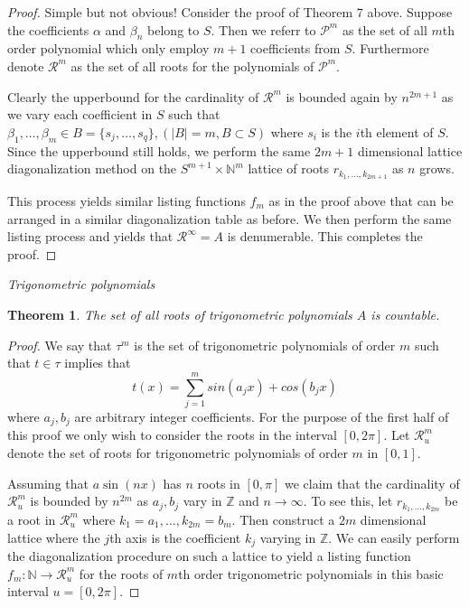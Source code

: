 \documentclass[letter]{article}
\newtheorem{theorem}{Theorem}
\newenvironment{menumerate}{%
  \edef\backupindent{\the\parindent}%
  \enumerate%
  \setlength{\parindent}{\backupindent}%
}{\endenumerate}
\begin{document}
\begin{menumerate}
\begin{menumerate}
	 		 		\begin{proof}
	 		 			Simple but not obvious! Consider the proof of Theorem 7 above. Suppose the coefficients $\alpha$ and $\beta_n$ belong to $S$. Then we referr to $\mathcal{P}^m$ as the set of all $m$th order polynomial which only employ $m+1$ coefficients from $S$. Furthermore denote $\mathcal{R}^m$ as the set of all roots for the polynomials of $\mathcal{P}^m.$ 

	 		 			Clearly the upperbound for the cardinality of $\mathcal{R}^m$ is bounded again by $n^{2m+1}$ as we vary each coefficient in $S$ such that $\beta_1,\dots,\beta_m \in B=\{s_j,\dots,s_q\}, (|B| = m, B\subset S)$ where $s_i$ is the $i$th element of $S$. 
	 		 			Since the upperbound still holds, we perform the same $2m+1$ dimensional lattice diagonalization method on the $S^{m+1} \times \mathbb{N}^{m}$ lattice of roots $r_{k_1,\dots,k_{2m+1}}$ as $n$ grows. 

	 		 			This process yields similar listing functions $f_m$ as in the proof above that can be arranged in a similar diagonalization table as before. We then perform the same listing process and yields that $\mathcal{R}^\infty = A$ is denumerable. This completes the proof.
	 		 		\end{proof}

 		 		\item \textit{Trigonometric polynomials}
 		 		\begin{theorem}
 		 			The set of all roots of trigonometric polynomials $A$ is countable.
 		 		\end{theorem}
 		 		\begin{proof}
 		 		 We say that $\tau^m$ is the set of trigonometric polynomials of order $m$ such that $t \in \tau$ implies that $$t(x) = \sum_{j=1}^m sin(a_jx) + cos(b_j x)$$ where $a_j, b_j$ are arbitrary integer coefficients. For the purpose of the first half of this proof we only wish to consider the roots in the interval $[0,2\pi].$ Let $\mathcal{R}_u^m$ denote the set of roots for trigonometric polynomials of order $m$ in $[0,1]$. 

 		 		 Assuming that $a\sin(nx)$ has $n$ roots in $[0,\pi]$ we claim that the cardinality of $\mathcal{R}_u^m$ is bounded by $n^{2m}$ as $a_j,b_j$ vary in $\mathbb{Z}$ and $n \to \infty.$ To see this, let $r_{k_1,\dots,k_{2m}}$ be a root in $\mathcal{R}_u^m$ where $k_1 = a_1,\dots, k_{2m} = b_m.$ Then construct a $2m$ dimensional lattice where the $j$th axis is the coefficient $k_j$ varying in $\mathbb{Z}.$ We can easily perform the diagonalization procedure on such a lattice to yield a listing function $f_m:\mathbb{N} \to \mathcal{R}_u^m$ for the roots of $m$th order trigonometric polynomials in this basic interval $u = [0,2\pi].$


\end{proof}
\end{menumerate}
\end{menumerate}
\end{document}
